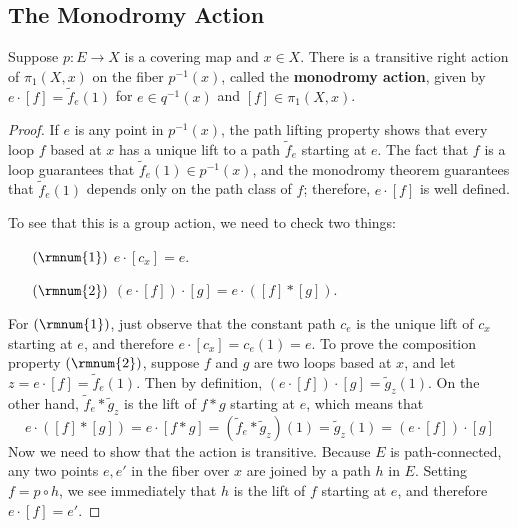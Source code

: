 \subsection{The Monodromy Action}
\begin{theorem}
Suppose $p:E\to X$ is a covering map and $x\in X$. There is a transitive right action of $\pi_1(X,x)$ on the fiber $p^{-1}(x)$, called the \textbf{monodromy action}, given by $e\cdot[f]=\widetilde{f}_e(1)$ for $e\in q^{-1}(x)$ and $[f]\in\pi_1(X,x)$.
\end{theorem}
\begin{proof}
If $e$ is any point in $p^{-1}(x)$, the path lifting property shows that every loop
$f$ based at $x$ has a unique lift to a path $\widetilde{f}_e$ starting at $e$. The fact that $f$ is a loop guarantees that $\widetilde{f}_e(1)\in p^{-1}(x)$, and the monodromy theorem guarantees that $\widetilde{f}_e(1)$ depends only on the path class of $f$; therefore, $e\cdot[f]$ is well defined.\par
To see that this is a group action, we need to check two things:
\begin{itemize}
\item[$(\rmnum{1})$] $e\cdot[c_x]=e$.
\item[$(\rmnum{2})$] $(e\cdot[f])\cdot[g]=e\cdot([f]\ast[g])$.
\end{itemize}
For $(\rmnum{1})$, just observe that the constant path $c_e$ is the unique lift of $c_x$ starting at $e$, and therefore $e\cdot[c_x]=c_e(1)=e$. To prove the composition property $(\rmnum{2})$, suppose $f$ and $g$ are two loops based at $x$, and let $z=e\cdot[f]=\widetilde{f}_e(1)$. Then by definition, $(e\cdot[f])\cdot[g]=\widetilde{g}_z(1)$. On the other hand, $\widetilde{f}_e\ast\widetilde{g}_z$ is the lift of $f\ast g$ starting at $e$, which means that
\[e\cdot([f]\ast[g])=e\cdot[f\ast g]=(\widetilde{f}_e\ast\widetilde{g}_z)(1)=\widetilde{g}_z(1)=(e\cdot[f])\cdot[g]\]
Now we need to show that the action is transitive. Because $E$ is path-connected,
any two points $e,e'$ in the fiber over $x$ are joined by a path $h$ in $E$. Setting $f=p\circ h$, we see immediately that $h$ is the lift of $f$ starting at $e$, and therefore $e\cdot[f]=e'$.
\end{proof}
